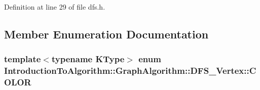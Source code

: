 Definition at line 29 of file dfs.\+h.



\subsection{Member Enumeration Documentation}
\hypertarget{struct_introduction_to_algorithm_1_1_graph_algorithm_1_1_d_f_s___vertex_a9455444fdfb1b29f24c1d27e74e7c124}{}
\subsubsection[{C\+O\+L\+O\+R}]{\setlength{\rightskip}{0pt plus 5cm}template$<$typename K\+Type$>$ enum {\bf Introduction\+To\+Algorithm\+::\+Graph\+Algorithm\+::\+D\+F\+S\+\_\+\+Vertex\+::\+C\+O\+L\+O\+R}\hspace{0.3cm}{\ttfamily [strong]}}\label{struct_introduction_to_algorithm_1_1_graph_algorithm_1_1_d_f_s___vertex_a9455444fdfb1b29f24c1d27e74e7c124}
